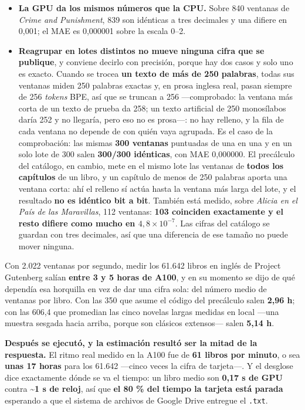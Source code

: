 \documentclass[11pt,a4paper]{article}
\begin{document}
\begin{itemize}[leftmargin=*, itemsep=3pt]
  \item \textbf{La GPU da los mismos números que la CPU.} Sobre 840 ventanas de
        \emph{Crime and Punishment}, 839 son idénticas a tres decimales y una difiere en
        0,001; el MAE es 0,000001 sobre la escala 0--2.
  \item \textbf{Reagrupar en lotes distintos no mueve ninguna cifra que se publique}, y
        conviene decirlo con precisión, porque hay dos casos y solo uno es exacto. Cuando
        se trocea \textbf{un texto de más de 250 palabras}, todas sus ventanas miden 250
        palabras exactas y, en prosa inglesa real, pasan siempre de 256 \emph{tokens} BPE,
        así que se truncan a 256 —comprobado: la ventana más corta de un texto de prueba
        da 258; un texto artificial de 250 monosílabos daría 252 y no llegaría, pero eso
        no es prosa—: no hay
        relleno, y la fila de cada ventana no depende de con quién vaya agrupada. Es el
        caso de la comprobación: las mismas \textbf{300 ventanas} puntuadas de una en una
        y en un solo lote de 300 salen \textbf{300/300 idénticas}, con MAE 0,000000. El
        precálculo del catálogo, en cambio, mete en el mismo lote las ventanas de
        \textbf{todos los capítulos} de un libro, y un capítulo de menos de 250 palabras
        aporta una ventana corta: ahí el relleno sí actúa hasta la ventana más larga del
        lote, y el resultado \textbf{no es idéntico bit a bit}. También está medido, sobre
        \emph{Alicia en el País de las Maravillas}, 112 ventanas: \textbf{103 coinciden
        exactamente y el resto difiere como mucho en $4{,}8\times 10^{-7}$}. Las cifras del
        catálogo se guardan con tres decimales, así que una diferencia de ese tamaño no
        puede mover ninguna.
\end{itemize}

Con 2.022 ventanas por segundo, medir los 61.642 libros en inglés de Project Gutenberg
salían \textbf{entre 3 y 5 horas de A100}, y en su momento se dijo de qué dependía esa
horquilla en vez de dar una cifra sola: del número medio de ventanas por libro. Con las
350 que asume el código del precálculo salen \textbf{2,96 h}; con las 606,4 que promedian
las cinco novelas largas medidas en local —una muestra sesgada hacia arriba, porque son
clásicos extensos— salen \textbf{5,14 h}.

\medskip
\noindent\textbf{Después se ejecutó, y la estimación resultó ser la mitad de la
respuesta.} El ritmo real medido en la A100 fue de \textbf{61 libros por minuto}, o sea
\textbf{unas 17 horas} para los 61.642 —cinco veces la cifra de tarjeta—. Y el desglose
dice exactamente dónde se va el tiempo: un libro medio son \textbf{0,17 s de GPU} contra
\textbf{\textasciitilde1 s de reloj}, así que \textbf{el 80 \% del tiempo la tarjeta está
parada} esperando a que el sistema de archivos de Google Drive entregue el \texttt{.txt}.
\end{document}

